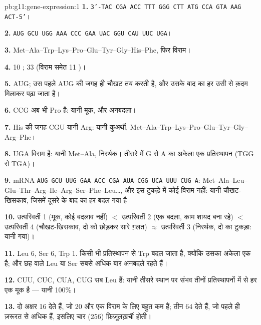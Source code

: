 \begin{solution}{pb:g11:gene-expression:1}
\textbf{1.} \texttt{3'-TAC CGA ACC TTT GGG CTT ATG CCA GTA AAG ACT-5'}।

\textbf{2.} \texttt{AUG GCU UGG AAA CCC GAA UAC GGU CAU UUC UGA}।

\textbf{3.} Met--Ala--Trp--Lys--Pro--Glu--Tyr--Gly--His--Phe, फिर विराम।

\textbf{4.} 10 ; 33  (विराम समेत 11 )।

\textbf{5.} AUG; उस पहले AUG की जगह ही चौखट तय करती है, और उसके बाद का हर
 उसी से क़दम मिलाकर पढ़ा जाता है।

\textbf{6.} CCG अब भी Pro है: यानी मूक, और  अनबदला।

\textbf{7.} His की जगह CGU यानी Arg: यानी कुअर्थी,
Met--Ala--Trp--Lys--Pro--Glu--Tyr--Gly--Arg--Phe।

\textbf{8.} UGA विराम है: यानी Met--Ala, निरर्थक। तीसरे  में G से A
का अकेला एक प्रतिस्थापन (TGG से TGA)।

\textbf{9.} mRNA \texttt{AUG GCU UUG GAA ACC CGA AUA CGG UCA UUU CUG
A}: Met--Ala--Leu--Glu--Thr--Arg--Ile--Arg--Ser--Phe--Leu\dots, और इस
टुकड़े में कोई विराम नहीं: यानी चौखट-खिसकाव, जिसमें दूसरे के बाद का हर
 बदल गया है।

\textbf{10.} उत्परिवर्ती 1 (मूक, कोई बदलाव नहीं) $<$ उत्परिवर्ती 2 (एक
 बदला, काम शायद बना रहे) $<$ उत्परिवर्ती 4 (चौखट-खिसकाव, दो को
छोड़कर सारे  ग़लत) $\approx$ उत्परिवर्ती 3 (निरर्थक, दो  का टुकड़ा: यानी  गया)।

\textbf{11.} Leu 6, Ser 6, Trp 1. किसी भी प्रतिस्थापन से Trp बदल जाता है,
क्योंकि उसका अकेला एक  है; और छह  वाले Leu या Ser सबसे अधिक बार
अनबदले रहते हैं।

\textbf{12.} CUU, CUC, CUA, CUG सब Leu हैं: यानी तीसरे स्थान पर संभव
तीनों प्रतिस्थापनों में से हर एक मूक है --- यानी 100\%।

\textbf{13.} दो अक्षर 16  देते हैं, जो 20  और एक विराम के
लिए बहुत कम हैं; तीन 64 देते हैं, जो पहले ही ज़रूरत से अधिक हैं, इसलिए चार
(256) फ़िज़ूलख़र्ची होती।


\end{solution}
